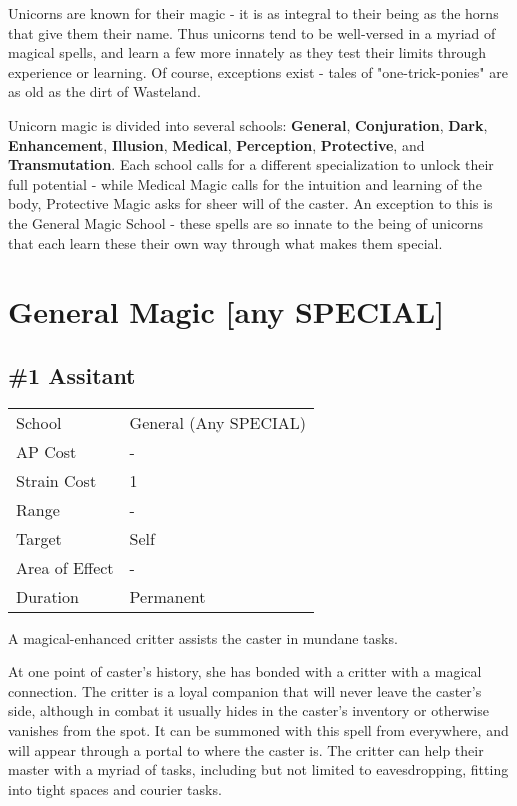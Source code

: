 \documentclass[11pt,a4paper,twocolumn]{book}
\begin{document}
Unicorns are known for their magic - it is as integral to their being as the horns that give them their name. Thus unicorns tend to be well-versed in a myriad of magical spells, and learn a few more innately as they test their limits through experience or learning. Of course, exceptions exist - tales of "one-trick-ponies" are as old as the dirt of Wasteland.

Unicorn magic is divided into several schools: \textbf{General}, \textbf{Conjuration}, \textbf{Dark}, \textbf{Enhancement}, \textbf{Illusion}, \textbf{Medical}, \textbf{Perception}, \textbf{Protective}, and \textbf{Transmutation}. Each school calls for a different specialization to unlock their full potential - while Medical Magic calls for the intuition and learning of the body, Protective Magic asks for sheer will of the caster. An exception to this is the General Magic School - these spells are so innate to the being of unicorns that each learn these their own way through what makes them special.

\vfill

\section*{General Magic [any SPECIAL]}
\subsection*{\#1 Assitant}
{
	\begin{tabu} to 75mm{| X[l,4] | X[l,7] |}
		\hline
		School 			& General (Any SPECIAL) 	\\
		AP Cost	      	& - 				\\
		Strain Cost     & 1 				\\
		Range     		& - 				\\
		Target      	& Self 				\\
		Area of Effect  & - 	 			\\
		Duration     	& Permanent 		\\ \hline
	\end{tabu}
	
}

\medskip

A magical-enhanced critter assists the caster in mundane tasks.

At one point of caster's history, she has bonded with a critter with a magical connection. The critter is a loyal companion that will never leave the caster's side, although in combat it usually hides in the caster's inventory or otherwise vanishes from the spot. It can be summoned with this spell from everywhere, and will appear through a portal to where the caster is. The critter can help their master with a myriad of tasks, including but not limited to eavesdropping, fitting into tight spaces and courier tasks.
\end{document}

